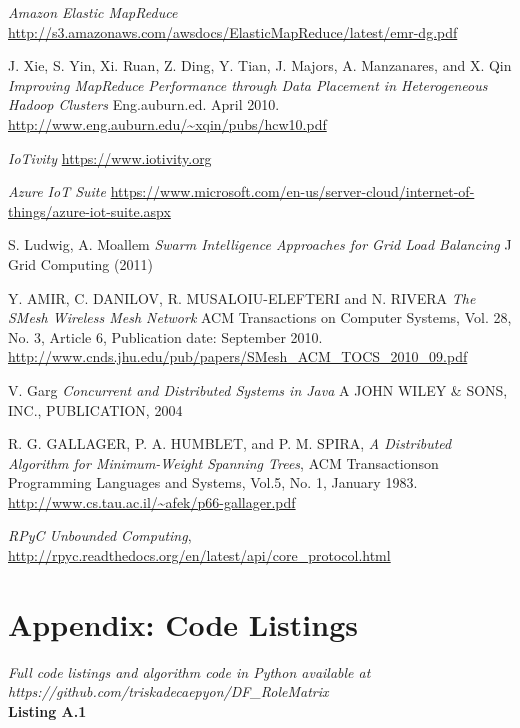 \documentclass[11pt]{article}
\begin{document}
\begin{thebibliography}{9}

  \emph{Amazon Elastic MapReduce}
  \url{http://s3.amazonaws.com/awsdocs/ElasticMapReduce/latest/emr-dg.pdf}

  J. Xie, S. Yin, Xi. Ruan, Z. Ding, Y. Tian, J. Majors, A. Manzanares, and X. Qin
  \emph{Improving MapReduce Performance through Data Placement in Heterogeneous Hadoop Clusters}
   Eng.auburn.ed. April 2010.
  \url{http://www.eng.auburn.edu/~xqin/pubs/hcw10.pdf}

  \emph{IoTivity}
  \url{https://www.iotivity.org}

  \emph{Azure IoT Suite}
  \url{https://www.microsoft.com/en-us/server-cloud/internet-of-things/azure-iot-suite.aspx}

  S. Ludwig, A. Moallem
  \emph{Swarm Intelligence Approaches for Grid Load Balancing}
  J Grid Computing (2011)

  Y. AMIR, C. DANILOV, R. MUSALOIU-ELEFTERI and N. RIVERA
  \emph{The SMesh Wireless Mesh Network}
  ACM Transactions on Computer Systems, Vol. 28, No. 3, Article 6, Publication date: September 2010.
  \url{http://www.cnds.jhu.edu/pub/papers/SMesh_ACM_TOCS_2010_09.pdf}

 V. Garg
 \emph{Concurrent and Distributed Systems in Java}
  A JOHN WILEY \& SONS, INC., PUBLICATION, 2004

  R. G. GALLAGER, P. A. HUMBLET, and P. M. SPIRA,
  \emph{A Distributed Algorithm for Minimum-Weight Spanning Trees},
  ACM Transactionson Programming Languages and Systems, Vol.5, No. 1, January 1983.
  \url{http://www.cs.tau.ac.il/~afek/p66-gallager.pdf}

  \emph{RPyC Unbounded Computing},
  \url{http://rpyc.readthedocs.org/en/latest/api/core_protocol.html}

\end{thebibliography}

\section{Appendix: Code Listings}
\appendix
\begin{center}
\textit{Full code listings and algorithm code in Python available at https://github.com/triskadecaepyon/DF\_RoleMatrix}\\
\vspace{3mm}
\large{\textbf{Listing A.1}}
\end{center}
\end{document}
